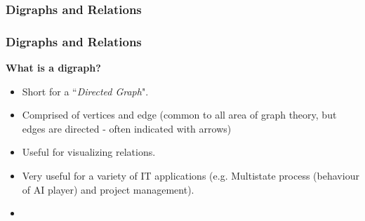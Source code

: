 \documentclass{beamer}
\begin{document}
\begin{frame}
\frametitle{Digraphs and Relations}
\end{frame}
\begin{frame}
\frametitle{Digraphs and Relations}
\textbf{What is a digraph?}
\begin{itemize}
\item Short for a ``\textit{Directed Graph}".
\item Comprised of vertices and edge (common to all area of graph theory, but edges are directed - often indicated with arrows)
\item Useful for visualizing relations.
\item Very useful for a variety of IT applications (e.g. Multistate process (behaviour of AI player) and project management).
\item 
\end{itemize}
\end{frame}
\end{document}
